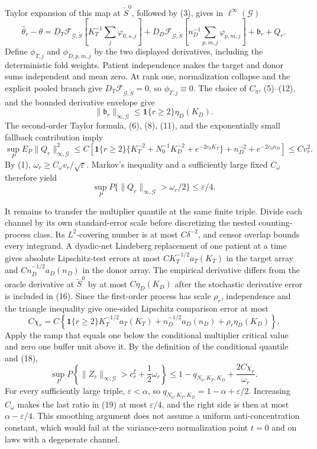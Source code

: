 Taylor expansion of this map at \(\widetilde S^0\), followed by (3), gives in \(\ell^\infty(\mathcal G)\)
\[
 \widehat\theta_r-\theta
 =D_T\mathcal F_{\mathcal G,\widetilde S}
   \left[K_T^{-1}\sum_j\varphi_{0,\star,j}\right]
 +D_D\mathcal F_{\mathcal G,\widetilde S}
   \left[n_D^{-1}\sum_{p,m,j}\varphi_{p,m,j}\right]
 +\mathfrak b_r+Q_r. \tag{14}
\]
Define \(\phi_{T,j}\) and \(\phi_{D,p,m,j}\) by the two displayed derivatives, including the deterministic fold weights. Patient independence makes the target and donor sums independent and mean zero. At rank one, normalization collapse and the explicit pooled branch give \(D_T\mathcal F_{\mathcal G,\widetilde S}=0\), so \(\phi_{T,j}\equiv0\). The choice of \(C_\eta\), (5)--(12), and the bounded derivative envelope give
\[
 \|\mathfrak b_r\|_{\infty,\mathcal G}
 \le\mathbf 1\{r\ge2\}\eta_D(K_D). \tag{15}
\]
The second-order Taylor formula, (6), (8), (11), and the exponentially small fallback contribution imply
\[
 \sup_P E_P\|Q_r\|_{\infty,\mathcal G}^2
 \le C\left[
 \mathbf 1\{r\ge2\}\{K_T^{-2}+N_0^{-1}K_D^{-2}+e^{-2c_0K_T}\}
 +n_D^{-2}+e^{-2c_0n_D}
 \right]
 \le Cv_r^2. \tag{16}
\]
By (1), \(\omega_r\ge C_\omega v_r/\sqrt\varepsilon\). Markov's inequality and a sufficiently large fixed \(C_\omega\) therefore yield
\[
 \sup_P P\{\|Q_r\|_{\infty,\mathcal G}>\omega_r/2\}
 \le\varepsilon/4. \tag{17}
\]

It remains to transfer the multiplier quantile at the same finite triple. Divide each channel by its own standard-error scale before discretizing the nested counting-process class. Its \(L^2\)-covering number is at most \(C\delta^{-2}\), and censor overlap bounds every integrand. A dyadic-net Lindeberg replacement of one patient at a time gives absolute Lipschitz-test errors at most \(CK_T^{-1/2}a_T(K_T)\) in the target array and \(Cn_D^{-1/2}a_D(n_D)\) in the donor array. The empirical derivative differs from the oracle derivative at \(\widetilde S^0\) by at most \(C\eta_D(K_D)\) after the stochastic derivative error is included in (16). Since the first-order process has scale \(\rho_r\), independence and the triangle inequality give one-sided Lipschitz comparison error at most
\[
 C\chi_r=C\left\{\mathbf 1\{r\ge2\}K_T^{-1/2}a_T(K_T)
 +n_D^{-1/2}a_D(n_D)+\rho_r\eta_D(K_D)\right\}. \tag{18}
\]
Apply the ramp that equals one below the conditional multiplier critical value and zero one buffer unit above it. By the definition of the conditional quantile and (18),
\[
 \sup_P P\!\left\{\|Z_r\|_{\infty,\mathcal G}>c_r^\xi+\frac12\omega_r\right\}
 \le1-q_{N_0,K_T,K_D}+\frac{2C\chi_r}{\omega_r}. \tag{19}
\]
For every sufficiently large triple, \(\varepsilon<\alpha\), so \(q_{N_0,K_T,K_D}=1-\alpha+\varepsilon/2\). Increasing \(C_\omega\) makes the last ratio in (19) at most \(\varepsilon/4\), and the right side is then at most \(\alpha-\varepsilon/4\). This smoothing argument does not assume a uniform anti-concentration constant, which would fail at the variance-zero normalization point \(t=0\) and on laws with a degenerate channel.

